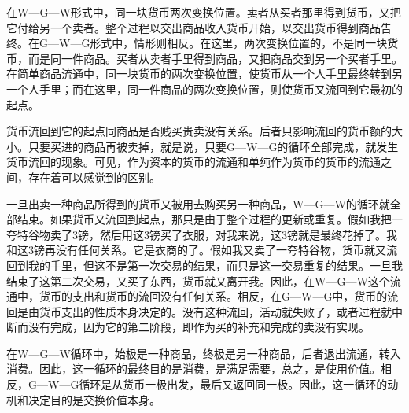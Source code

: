 \documentclass{ctexbook}
\begin{document}
    在W—G—W形式中，同一块货币两次变换位置。卖者从买者那里得到货币，又把它付给另一个卖者。整个过程以交出商品收入货币开始，以交出货币得到商品告终。在G—W—G形式中，情形则相反。在这里，两次变换位置的，不是同一块货币，而是同一件商品。买者从卖者手里得到商品，又把商品交到另一个买者手里。在简单商品流通中，同一块货币的两次变换位置，使货币从一个人手里最终转到另一个人手里；而在这里，同一件商品的两次变换位置，则使货币又流回到它最初的起点。

    货币流回到它的起点同商品是否贱买贵卖没有关系。后者只影响流回的货币额的大小。只要买进的商品再被卖掉，就是说，只要G—W—G的循环全部完成，就发生货币流回的现象。可见，作为资本的货币的流通和单纯作为货币的货币的流通之间，存在着可以感觉到的区别。

    一旦出卖一种商品所得到的货币又被用去购买另一种商品，W—G—W的循环就全部结束。如果货币又流回到起点，那只是由于整个过程的更新或重复。假如我把一夸特谷物卖了3镑，然后用这3镑买了衣服，对我来说，这3镑就是最终花掉了。我和这3镑再没有任何关系。它是衣商的了。假如我又卖了一夸特谷物，货币就又流回到我的手里，但这不是第一次交易的结果，而只是这一交易重复的结果。一旦我结束了这第二次交易，又买了东西，货币就又离开我。因此，在W—G—W这个流通中，货币的支出和货币的流回没有任何关系。相反，在G—W—G中，货币的流回是由货币支出的性质本身决定的。没有这种流回，活动就失败了，或者过程就中断而没有完成，因为它的第二阶段，即作为买的补充和完成的卖没有实现。

    在W—G—W循环中，始极是一种商品，终极是另一种商品，后者退出流通，转入消费。因此，这一循环的最终目的是消费，是满足需要，总之，是使用价值。相反，G—W—G循环是从货币一极出发，最后又返回同一极。因此，这一循环的动机和决定目的是交换价值本身。
\end{document}
